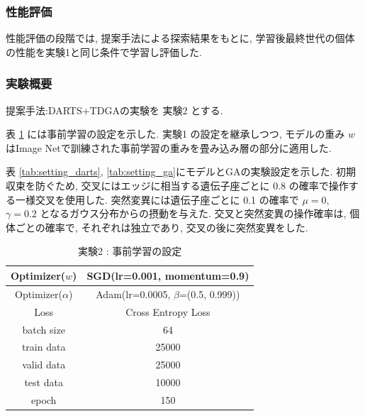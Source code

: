 

\subsubsection{性能評価}

性能評価の段階では, 提案手法による探索結果をもとに,
学習後最終世代の個体の性能を実験1と同じ条件で学習し評価した.


\changeindent{0cm}
\subsubsection{実験概要}
\label{sec:pred.02_03}
\changeindent{2cm}

提案手法:DARTS+TDGAの実験を 実験2 とする.

表 \ref{tab:setting_pretrain} には事前学習の設定を示した.
実験1 の設定を継承しつつ,
モデルの重み $w$ はImage Netで訓練された事前学習の重みを畳み込み層の部分に適用した.

表 \ref{tab:setting_darts}, \ref{tab:setting_ga}にモデルとGAの実験設定を示した.
初期収束を防ぐため, 交叉にはエッジに相当する遺伝子座ごとに 0.8 の確率で操作する一様交叉を使用した.
突然変異には遺伝子座ごとに 0.1 の確率で $\mu=0$, $\gamma=0.2$ となるガウス分布からの摂動を与えた.
交叉と突然変異の操作確率は, 個体ごとの確率で, それぞれは独立であり, 交叉の後に突然変異をした.


\begin{table}[tb]
  \begin{center}
    \caption{実験2 : 事前学習の設定}
  	\vspace{3mm}
    \begin{tabular}{|c|c|} \hline
      Optimizer($w$) & SGD(lr=0.001, momentum=0.9) \\ \hline
      Optimizer($\alpha$) & Adam(lr=0.0005, $\beta$=(0.5, 0.999)) \\ \hline
      Loss & Cross Entropy Loss \\ \hline
      batch size & 64 \\ \hline
      train data & 25000\\ \hline
      valid data & 25000\\ \hline
      test data &  10000\\ \hline
      epoch & 150\\ \hline
    \end{tabular}
    \label{tab:setting_pretrain}
  \end{center}
\end{table}


